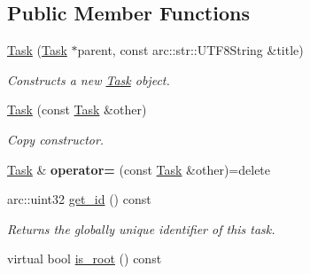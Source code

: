 \subsection*{Public Member Functions}
\begin{DoxyCompactItemize}
\item 
\hyperlink{classsigma_1_1core_1_1tasks_1_1_task_aad786cb04967106a10e79004bffbc5aa}{Task} (\hyperlink{classsigma_1_1core_1_1tasks_1_1_task}{Task} $\ast$parent, const arc\+::str\+::\+U\+T\+F8\+String \&title)
\begin{DoxyCompactList}\small\item\em Constructs a new \hyperlink{classsigma_1_1core_1_1tasks_1_1_task}{Task} object. \end{DoxyCompactList}\item 
\hyperlink{classsigma_1_1core_1_1tasks_1_1_task_a222255707537a07f64c687c87efef1e6}{Task} (const \hyperlink{classsigma_1_1core_1_1tasks_1_1_task}{Task} \&other)
\begin{DoxyCompactList}\small\item\em Copy constructor. \end{DoxyCompactList}\item 
\hypertarget{classsigma_1_1core_1_1tasks_1_1_task_a0deca6972a54102c60c212e0d5827d0b}{}\hyperlink{classsigma_1_1core_1_1tasks_1_1_task}{Task} \& {\bfseries operator=} (const \hyperlink{classsigma_1_1core_1_1tasks_1_1_task}{Task} \&other)=delete\label{classsigma_1_1core_1_1tasks_1_1_task_a0deca6972a54102c60c212e0d5827d0b}

\item 
arc\+::uint32 \hyperlink{classsigma_1_1core_1_1tasks_1_1_task_a967b192bba48756a7f031c91088bb0db}{get\+\_\+id} () const 
\begin{DoxyCompactList}\small\item\em Returns the globally unique identifier of this task. \end{DoxyCompactList}\item 
\hypertarget{classsigma_1_1core_1_1tasks_1_1_task_a615ceebc720367c0b26652163118bcb9}{}virtual bool \hyperlink{classsigma_1_1core_1_1tasks_1_1_task_a615ceebc720367c0b26652163118bcb9}{is\+\_\+root} () const \label{classsigma_1_1core_1_1tasks_1_1_task_a615ceebc720367c0b26652163118bcb9}


\end{DoxyCompactItemize}
